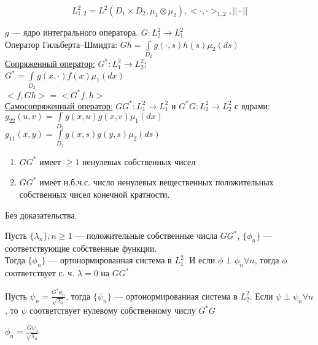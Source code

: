 \begin{equation*}
L_{1,2}^2 = L^2(D_1 \times D_2,\mu_1\otimes \mu_2), <\cdot,\cdot>_{1,2},  ||\cdot||
\end{equation*}

$g$ --- ядро интегрального оператора. $G: L_2^2 \longrightarrow L_1^2$\\

Оператор Гильберта--Шмидта: $Gh = \int \limits_{D_2} g(\cdot,s) h(s) \mu_2(ds)$\\

\underline{Сопряженный оператор:} $G^{*}: L_1^2 \longrightarrow L_2^2$; \\
$G^{*} = \int \limits_{D_2}	g(x,\cdot) f(x) \mu_1(dx)$\\
$< f, Gh > = < G^{*}f, h >$\\

\underline{Самосопряженный оператор:} $GG^{*}: L_1^2 \longrightarrow L_1^2$ и $G^{*}G: L_2^2 \longrightarrow L_2^2$ с ядрами:\\
$g_{22}(u,v) = \int \limits_{D_1} g(x,u) g(x,v) \mu_1(dx)$\\
$g_{11}(x,y) = \int \limits_{D_2} g(x,s) g(y,s) \mu_2(ds)$\\

\begin{thm}
\begin{enumerate}
\item $GG^{*}$ имеет $\geqslant 1$ ненулевых собственных чисел
\item $GG^{*}$ имеет н.б.ч.с. число ненулевых вещественных положительных собственных чисел конечной кратности. 
\end{enumerate}
\end{thm}
Без доказательства.

\begin{prop}[1]
Пусть $\{\lambda_n\}, n \geqslant 1$ --- положительные собственные числа $GG^{*}$, $\{\phi_n\}$ --- соответствующие собственные функции.\\
Тогда $\{\phi_n\}$ --- ортонормированная система в $L_1^2$. И если $\phi \perp \phi_n \forall n$, тогда $\phi$ соответствует с. ч. $\lambda = 0$ на $GG^{*}$
\end{prop}
\begin{prop}[2]
Пусть $\psi_n = \frac{G^{*}\phi_n}{\sqrt{\lambda_n}}$, тогда $\{\psi_n\}$ --- ортонормированная система в $L_2^2$.
Если $\psi \perp \psi_n \forall n$, то $\psi$ соответствует нулевому собственному числу $G^{*}G$
\end{prop}
\begin{prop}[3]
$\phi_n = \frac{G\psi_n}{\sqrt{\lambda_n}}$
\end{prop} 

